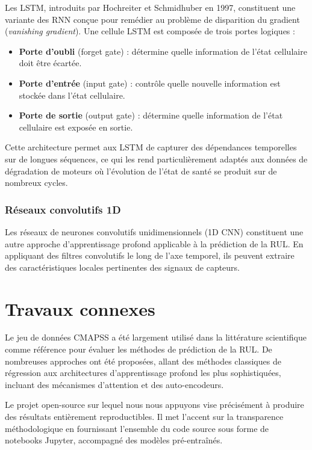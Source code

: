 \documentclass[12pt,a4paper]{report}
\theoremstyle{definition}
\begin{document}
Les LSTM, introduits par Hochreiter et Schmidhuber en 1997, constituent une variante des RNN conçue pour remédier au problème de disparition du gradient (\emph{vanishing gradient}). Une cellule LSTM est composée de trois portes logiques :
\begin{itemize}
    \item \textbf{Porte d'oubli} (forget gate) : détermine quelle information de l'état cellulaire doit être écartée.
    \item \textbf{Porte d'entrée} (input gate) : contrôle quelle nouvelle information est stockée dans l'état cellulaire.
    \item \textbf{Porte de sortie} (output gate) : détermine quelle information de l'état cellulaire est exposée en sortie.
\end{itemize}

Cette architecture permet aux LSTM de capturer des dépendances temporelles sur de longues séquences, ce qui les rend particulièrement adaptés aux données de dégradation de moteurs où l'évolution de l'état de santé se produit sur de nombreux cycles.

\subsubsection{Réseaux convolutifs 1D}

Les réseaux de neurones convolutifs unidimensionnels (1D CNN) constituent une autre approche d'apprentissage profond applicable à la prédiction de la RUL. En appliquant des filtres convolutifs le long de l'axe temporel, ils peuvent extraire des caractéristiques locales pertinentes des signaux de capteurs.

\section{Travaux connexes}

Le jeu de données CMAPSS a été largement utilisé dans la littérature scientifique comme référence pour évaluer les méthodes de prédiction de la RUL. De nombreuses approches ont été proposées, allant des méthodes classiques de régression aux architectures d'apprentissage profond les plus sophistiquées, incluant des mécanismes d'attention et des auto-encodeurs.

Le projet open-source sur lequel nous nous appuyons vise précisément à produire des résultats entièrement reproductibles. Il met l'accent sur la transparence méthodologique en fournissant l'ensemble du code source sous forme de notebooks Jupyter, accompagné des modèles pré-entraînés.
\end{document}
